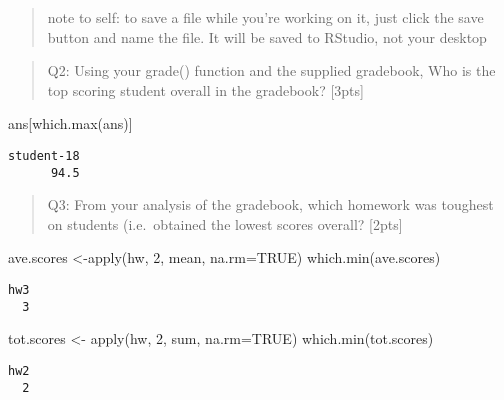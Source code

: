 \documentclass[
  letterpaper,
  DIV=11,
  numbers=noendperiod]{scrartcl}
\newenvironment{Shaded}{\begin{snugshade}}{\end{snugshade}}
\newcommand{\AttributeTok}[1]{\textcolor[rgb]{0.40,0.45,0.13}{#1}}
\newcommand{\ConstantTok}[1]{\textcolor[rgb]{0.56,0.35,0.01}{#1}}
\newcommand{\DecValTok}[1]{\textcolor[rgb]{0.68,0.00,0.00}{#1}}
\newcommand{\FunctionTok}[1]{\textcolor[rgb]{0.28,0.35,0.67}{#1}}
\newcommand{\NormalTok}[1]{\textcolor[rgb]{0.00,0.23,0.31}{#1}}
\newcommand{\OtherTok}[1]{\textcolor[rgb]{0.00,0.23,0.31}{#1}}
\begin{document}
\begin{quote}
note to self: to save a file while you're working on it, just click the
save button and name the file. It will be saved to RStudio, not your
desktop
\end{quote}

\begin{quote}
Q2: Using your grade() function and the supplied gradebook, Who is the
top scoring student overall in the gradebook? {[}3pts{]}
\end{quote}

\begin{Shaded}
\begin{Highlighting}[]
\NormalTok{ans[}\FunctionTok{which.max}\NormalTok{(ans)]}
\end{Highlighting}
\end{Shaded}

\begin{verbatim}
student-18 
      94.5 
\end{verbatim}

\begin{quote}
Q3: From your analysis of the gradebook, which homework was toughest on
students (i.e.~obtained the lowest scores overall? {[}2pts{]}
\end{quote}

\begin{Shaded}
\begin{Highlighting}[]
\NormalTok{ave.scores }\OtherTok{\textless{}{-}}\FunctionTok{apply}\NormalTok{(hw, }\DecValTok{2}\NormalTok{, mean, }\AttributeTok{na.rm=}\ConstantTok{TRUE}\NormalTok{)}
\FunctionTok{which.min}\NormalTok{(ave.scores)}
\end{Highlighting}
\end{Shaded}

\begin{verbatim}
hw3 
  3 
\end{verbatim}

\begin{Shaded}
\begin{Highlighting}[]
\NormalTok{tot.scores }\OtherTok{\textless{}{-}} \FunctionTok{apply}\NormalTok{(hw, }\DecValTok{2}\NormalTok{, sum, }\AttributeTok{na.rm=}\ConstantTok{TRUE}\NormalTok{)}
\FunctionTok{which.min}\NormalTok{(tot.scores)}
\end{Highlighting}
\end{Shaded}

\begin{verbatim}
hw2 
  2 
\end{verbatim}
\end{document}
